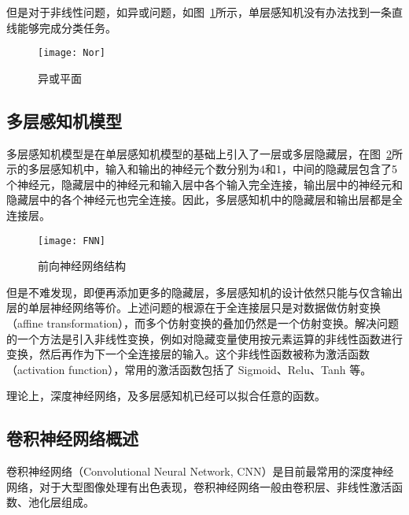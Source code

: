 但是对于非线性问题，如异或问题，如图~\ref{fig:Nor}所示，单层感知机没有办法找到一条直线能够完成分类任务。

\begin{figure}[!htbp]
    \centering
    \texttt{[image: Nor]}
    \caption{异或平面}
    \label{fig:Nor}
\end{figure}

\subsection{多层感知机模型}

多层感知机模型是在单层感知机模型的基础上引入了一层或多层隐藏层，在图~\ref{fig:FNN}所示的多层感知机中，输入和输出的神经元个数分别为4和1，中间的隐藏层包含了5个神经元，隐藏层中的神经元和输入层中各个输入完全连接，输出层中的神经元和隐藏层中的各个神经元也完全连接。因此，多层感知机中的隐藏层和输出层都是全连接层。

\begin{figure}[!htbp]
    \centering
    \texttt{[image: FNN]}
    \caption{前向神经网络结构}
    \label{fig:FNN}
\end{figure}

但是不难发现，即便再添加更多的隐藏层，多层感知机的设计依然只能与仅含输出层的单层神经网络等价。上述问题的根源在于全连接层只是对数据做仿射变换（affine transformation），而多个仿射变换的叠加仍然是一个仿射变换。解决问题的一个方法是引入非线性变换，例如对隐藏变量使用按元素运算的非线性函数进行变换，然后再作为下一个全连接层的输入。这个非线性函数被称为激活函数（activation function），常用的激活函数包括了 Sigmoid、Relu、Tanh 等。

理论上，深度神经网络，及多层感知机已经可以拟合任意的函数\citep{HORNIK1991251}。

\subsection{卷积神经网络概述}

卷积神经网络（Convolutional Neural Network, CNN）是目前最常用的深度神经网络，对于大型图像处理有出色表现，卷积神经网络一般由卷积层、非线性激活函数、池化层组成。

